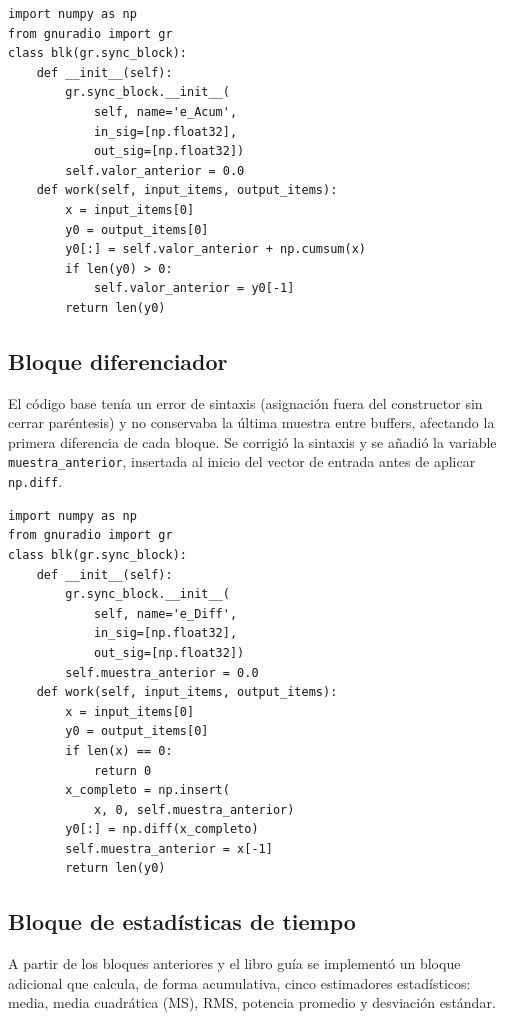 \documentclass[twocolumn]{IEEEtran}
\begin{document}
\begin{lstlisting}[caption={Bloque acumulador con memoria de estado}, label={lst:acumulador}]
import numpy as np
from gnuradio import gr
class blk(gr.sync_block):
    def __init__(self):
        gr.sync_block.__init__(
            self, name='e_Acum',
            in_sig=[np.float32],
            out_sig=[np.float32])
        self.valor_anterior = 0.0
    def work(self, input_items, output_items):
        x = input_items[0]
        y0 = output_items[0]
        y0[:] = self.valor_anterior + np.cumsum(x)
        if len(y0) > 0:
            self.valor_anterior = y0[-1]
        return len(y0)
\end{lstlisting}

\subsection{Bloque diferenciador}


El código base \cite{ortega2019comunicaciones}  tenía un error de sintaxis (asignación fuera del constructor sin 
cerrar paréntesis) y no conservaba la última muestra entre buffers, afectando la 
primera diferencia de cada bloque. Se corrigió la sintaxis y se añadió la variable 
\texttt{muestra\_anterior}, insertada al inicio del vector de entrada antes de 
aplicar \texttt{np.diff}.

\begin{lstlisting}[caption={Bloque diferenciador con continuidad entre buffers}, label={lst:diferenciador}]
import numpy as np
from gnuradio import gr
class blk(gr.sync_block):
    def __init__(self):
        gr.sync_block.__init__(
            self, name='e_Diff',
            in_sig=[np.float32],
            out_sig=[np.float32])
        self.muestra_anterior = 0.0
    def work(self, input_items, output_items):
        x = input_items[0]
        y0 = output_items[0]
        if len(x) == 0:
            return 0
        x_completo = np.insert(
            x, 0, self.muestra_anterior)
        y0[:] = np.diff(x_completo)
        self.muestra_anterior = x[-1]
        return len(y0)
\end{lstlisting}

\subsection{Bloque de estadísticas de tiempo}

A partir de los bloques anteriores y el libro guía \cite{ortega2019comunicaciones} 
se implementó un bloque adicional que calcula, de forma acumulativa, cinco 
estimadores estadísticos: media, media cuadrática (MS), RMS, potencia promedio y 
desviación estándar.
\end{document}
